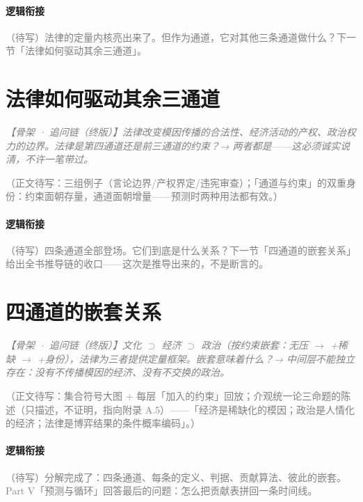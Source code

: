 \documentclass[../../main2.tex]{subfiles}
\begin{document}
	\paragraph*{逻辑衔接}
	\textcolor{gray}{（待写）法律的定量内核亮出来了。但作为通道，它对其他三条通道做什么？下一节「法律如何驱动其余三通道」。}

	\section{法律如何驱动其余三通道}
	\label{sec:law-drives}

	\textcolor{gray}{\textit{【骨架 · 追问链（终版）】法律改变模因传播的合法性、经济活动的产权、政治权力的边界。法律是第四通道还是前三通道的约束？→ 两者都是——这必须诚实说清，不许一笔带过。}}

	\textcolor{gray}{（正文待写：三组例子（言论边界/产权界定/违宪审查）；「通道与约束」的双重身份：约束面朝存量，通道面朝增量——预测时两种用法都有效。）}

	\paragraph*{逻辑衔接}
	\textcolor{gray}{（待写）四条通道全部登场。它们到底是什么关系？下一节「四通道的嵌套关系」给出全书推导链的收口——这次是推导出来的，不是断言的。}

	\section{四通道的嵌套关系}
	\label{sec:law-nesting}

	\textcolor{gray}{\textit{【骨架 · 追问链（终版）】文化 $\supset$ 经济 $\supset$ 政治（按约束嵌套：无压 $\to$ +稀缺 $\to$ +身份），法律为三者提供定量框架。嵌套意味着什么？→ 中间层不能独立存在：没有不传播模因的经济、没有不交换的政治。}}

	\textcolor{gray}{（正文待写：集合符号大图 + 每层「加入的约束」回放；介观统一论三命题的陈述（只描述，不证明，指向附录 A.5）——「经济是稀缺化的模因；政治是人情化的经济；法律是博弈结果的条件概率编码」。）}

	\paragraph*{逻辑衔接}
	\textcolor{gray}{（待写）分解完成了：四条通道、每条的定义、判据、贡献算法、彼此的嵌套。Part V「预测与循环」回答最后的问题：怎么把贡献表拼回一条时间线。}
\end{document}
